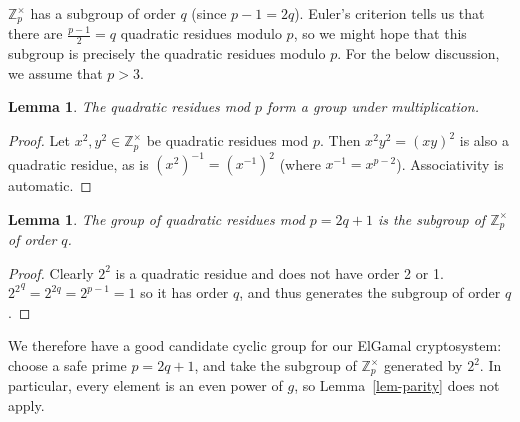 \documentclass[12pt,a4paper]{article}
\newtheorem{lemma}[theorem]{Lemma}
\theoremstyle{definition}
\begin{document}
$\mathbb{Z}^\times_p$ has a subgroup of order $q$ (since $p-1=2q$). Euler's criterion tells us that there are $\frac{p-1}{2}=q$ quadratic residues modulo $p$, so we might hope that this subgroup is precisely the quadratic residues modulo $p$. For the below discussion, we assume that $p>3$.
\begin{lemma}
    The quadratic residues mod $p$ form a group under multiplication.
\end{lemma}
\begin{proof}
    Let $x^2,y^2\in\mathbb{Z}^\times_p$ be quadratic residues mod $p$. Then $x^2y^2=(xy)^2$ is also a quadratic residue, as is $(x^2)^{-1}=(x^{-1})^2$ (where $x^{-1}=x^{p-2}$). Associativity is automatic.
\end{proof}
\begin{lemma}
    The group of quadratic residues mod $p=2q+1$ is the subgroup of $\mathbb{Z}^\times_p$ of order $q$.
\end{lemma}
\begin{proof}
    Clearly $2^2$ is a quadratic residue and does not have order 2 or 1. ${2^2}^q=2^{2q}=2^{p-1}=1$ so it has order $q$, and thus generates the subgroup of order $q$.
\end{proof}

We therefore have a good candidate cyclic group for our ElGamal cryptosystem: choose a safe prime $p=2q+1$, and take the subgroup of $\mathbb{Z}^\times_p$ generated by $2^2$. In particular, every element is an even power of $g$, so Lemma~\ref{lem-parity} does not apply.
\end{document}
